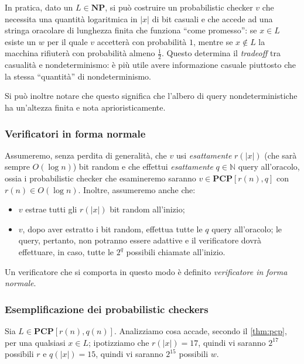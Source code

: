 In pratica,  dato un $L \in \mathbf{NP}$, si può costruire un probabilistic checker $v$
che necessita una quantità logaritmica in $|x|$ di bit casuali e che accede ad una stringa
oracolare di lunghezza finita che funziona ``come promesso'': se $x \in L$ esiste un $w$
per il quale $v$ accetterà con probabilità $1$, mentre
se $x \notin L$ la macchina rifiuterà con probabilità almeno $\frac{1}{2}$.
Questo determina il \textit{tradeoff} tra casualità e nondeterminismo: è più utile
avere informazione casuale piuttosto che la stessa ``quantità'' di nondeterminismo.

Si può inoltre notare che questo significa che l'albero di query nondeterministiche
ha un'altezza finita e nota aprioristicamente.

\subsubsection{Verificatori in forma normale}
Assumeremo, senza perdita di generalità, che
$v$ usi \textit{esattamente} $r(|x|)$ (che sarà sempre $O(\log n)$) bit
random e che effettui \textit{esattamente} $q \in \mathbb{N}$ query all'oracolo,
ossia i probabilistic checker che esamineremo saranno $v \in \mathbf{PCP}[r(n), q]$
con $r(n) \in O(\log n)$.
Inoltre, assumeremo anche che:
\begin{itemize}
	\item $v$ estrae tutti gli $r(|x|)$ bit random all'inizio;
	\item $v$, dopo aver estratto i bit random, effettua tutte le $q$ query all'oracolo;
	      le query, pertanto, non potranno essere adattive e il verificatore
	      dovrà effettuare, in caso, tutte le $2^q$ possibili chiamate all'inizio.
\end{itemize}
Un verificatore che si comporta in questo modo è definito \textit{verificatore in forma normale}.

\subsubsection{Esemplificazione dei probabilistic checkers}
Sia $L \in \mathbf{PCP}[r(n), q(n)]$. Analizziamo cosa accade, secondo il
\cref{thm:pcp}, per una qualsiasi $x \in L$; ipotizziamo che $r(|x|) =  17$,
quindi vi saranno $2^{17}$ possibili $r$ e $q(|x|) = 15$, quindi vi saranno
$2^{15}$ possibili $w$.


